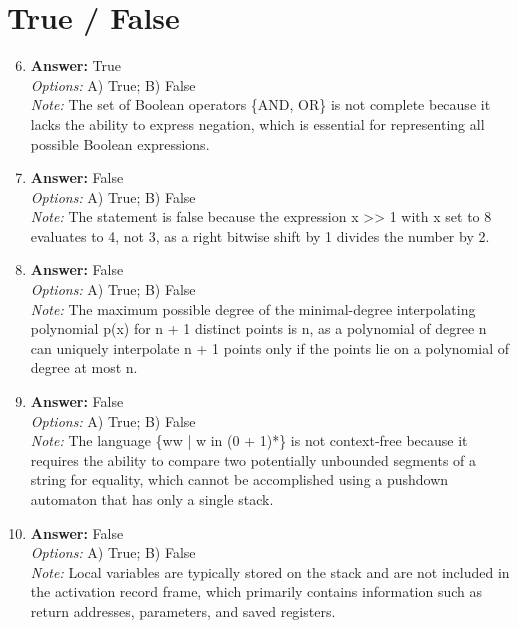 \documentclass[12pt]{article}
\begin{document}
\section*{True / False}
\begin{enumerate}[label=\arabic*.]
\setcounter{enumi}{5}
\item \textbf{Answer:} True
\\ \textit{Options:} A) True; B) False
\\ \textit{Note:} The set of Boolean operators \{AND, OR\} is not complete because it lacks the ability to express negation, which is essential for representing all possible Boolean expressions.
\item \textbf{Answer:} False
\\ \textit{Options:} A) True; B) False
\\ \textit{Note:} The statement is false because the expression x \textgreater{}\textgreater{} 1 with x set to 8 evaluates to 4, not 3, as a right bitwise shift by 1 divides the number by 2.
\item \textbf{Answer:} False
\\ \textit{Options:} A) True; B) False
\\ \textit{Note:} The maximum possible degree of the minimal-degree interpolating polynomial p(x) for n + 1 distinct points is n, as a polynomial of degree n can uniquely interpolate n + 1 points only if the points lie on a polynomial of degree at most n.
\item \textbf{Answer:} False
\\ \textit{Options:} A) True; B) False
\\ \textit{Note:} The language \{ww | w in (0 + 1)*\} is not context-free because it requires the ability to compare two potentially unbounded segments of a string for equality, which cannot be accomplished using a pushdown automaton that has only a single stack.
\item \textbf{Answer:} False
\\ \textit{Options:} A) True; B) False
\\ \textit{Note:} Local variables are typically stored on the stack and are not included in the activation record frame, which primarily contains information such as return addresses, parameters, and saved registers.
\end{enumerate}
\end{document}
